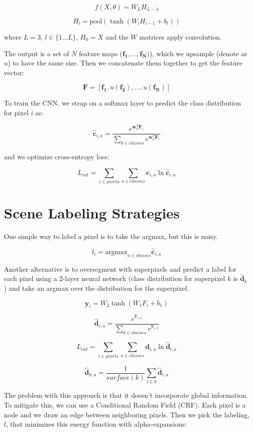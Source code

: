 \documentclass[a4paper]{article}
\begin{document}
$$
f(X, \theta) = W_L H_{L-1}
$$

$$
H_l = \textrm{pool}(\tanh(W_l H_{l-1} + b_l))
$$

where $L = 3$, $l \in \{1...L\}$, $H_0 = X$ and the $W$ matrices apply
convolution.

The output is a set of $N$ feature maps ($\mathbf{f_1}, ..., \mathbf{f_N})$),
which we upsample (denote as $u$) to have the same size. Then we concatenate
them together to get the feature vector:

$$
\mathbf{F} = [\mathbf{f_1}, u(\mathbf{f_2}), ..., u(\mathbf{f_N})]
$$

To train the CNN, we strap on a softmax layer to predict the class distribution
for pixel $i$ as:

$$
\hat{\mathbf{c}}_{i, a} = \frac{e^{\mathbf{w}_a^T \mathbf{F}_i}}{
\sum_{b \in classes}{e^{\mathbf{w}_b^T \mathbf{F}_i}}
}
$$

and we optimize cross-entropy loss:

$$
L_{cat} = \sum_{i \in pixels}{\sum_{a \in classes}{\mathbf{c}_{i, a} \ln{
\hat{\mathbf{c}}_{i, a}
}}}
$$

\section{Scene Labeling Strategies}
One simple way to label a pixel is to take the argmax, but this is noisy.

$$
l_i = \textrm{argmax}_{a \in classes}{\hat{\mathbf{c}}_{i, a}}
$$

Another alternative is to oversegment with superpixels and predict a label
for each pixel using a 2-layer neural network (class distribution for
superpixel $k$ is $\hat{\mathbf{d}}_k$) and take an argmax over the distribution
for the superpixel.

$$
\mathbf{y}_i = W_2 \tanh(W_1 F_i + b_1)
$$

$$
\hat{\mathbf{d}}_{i, a} = \frac{e^{\mathbf{y}_{i, a}}}{\sum_{b \in classes}{
e^{\mathbf{y}_{i, b}}
}}
$$

$$
L_{cat} = \sum_{i \in pixels}{\sum_{a \in classes}}{\mathbf{d}_{i, a} \ln{
\hat{\mathbf{d}}_{i, a}
}}
$$

$$
\hat{\mathbf{d}}_{k, a} = \frac{1}{surface(k)} \sum_{i \in k}
\hat{\mathbf{d}}_{i, a}
$$

The problem with this approach is that it doesn't incorporate global
information. To mitigate this, we can use a Conditional Random Field (CRF).
Each pixel is a node and we draw an edge between neighboring pixels. Then we
pick the labeling, $l$, that minimizes this energy function with
alpha-expansions:
\end{document}

